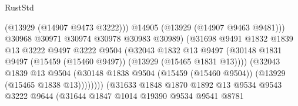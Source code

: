 \begin{lexlean}{RustStd}
\begin{coremodule}
                                              (@13929 (@14907 @9473 @3222)))
                                            @14905
                                            (@13929 (@14907 @9463 @9481)))
                                          @30968
                                          @30971
                                          @30974
                                          @30978
                                          @30983
                                          @30989)
                                        (@31698
                                          @9491
                                          @1832
                                          @1839
                                          @13
                                          @3222
                                          @9497
                                          @3222
                                          @9504
                                          (@32043
                                            @1832
                                            @13
                                            @9497
                                            (@30148
                                              @1831
                                              @9497
                                              (@15459 (@15460 @9497))
                                              (@13929 (@15465 @1831 @13))))
                                          (@32043
                                            @1839
                                            @13
                                            @9504
                                            (@30148
                                              @1838
                                              @9504
                                              (@15459 (@15460 @9504))
                                              (@13929 (@15465 @1838 @13))))))))
                                  (@31633
                                    @1848
                                    @1870
                                    @1892
                                    @13
                                    @9534
                                    @9543
                                    @3222
                                    @9644
                                    (@31644
                                      @1847
                                      @1014
                                      @19390
                                      @9534
                                      @9541
                                      @8781

\end{coremodule}
\end{lexlean}
